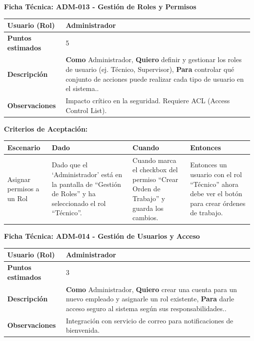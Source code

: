 \noindent
\textbf{Ficha Técnica: ADM-013 - Gestión de Roles y Permisos}
\footnotesize
\begin{longtable}{|p{}|p{}|}
\hline
\textbf{Usuario (Rol)} & Administrador \\ \hline
\textbf{Puntos estimados} & 5 \\ \hline
\textbf{Descripción} & \textbf{Como} Administrador, \textbf{Quiero} definir y gestionar los roles de usuario (ej. Técnico, Supervisor), \textbf{Para} controlar qué conjunto de acciones puede realizar cada tipo de usuario en el sistema.. \\ \hline
\textbf{Observaciones} & Impacto crítico en la seguridad. Requiere ACL (Access Control List). \\ \hline
\end{longtable}
\normalsize

\noindent
\textbf{Criterios de Aceptación:}
\footnotesize
\begin{longtable}{|p{}|p{}|p{}|p{}|}
\hline
\textbf{Escenario} & \textbf{Dado} & \textbf{Cuando} & \textbf{Entonces} \\ \hline
\endhead
Asignar permisos a un Rol & Dado que el `Administrador' está en la pantalla de ``Gestión de Roles'' y ha seleccionado el rol ``Técnico''. & Cuando marca el checkbox del permiso ``Crear Orden de Trabajo'' y guarda los cambios. & Entonces un usuario con el rol ``Técnico'' ahora debe ver el botón para crear órdenes de trabajo. \\ \hline
\end{longtable}
\normalsize

\noindent
\textbf{Ficha Técnica: ADM-014 - Gestión de Usuarios y Acceso}
\footnotesize
\begin{longtable}{|p{}|p{}|}
\hline
\textbf{Usuario (Rol)} & Administrador \\ \hline
\textbf{Puntos estimados} & 3 \\ \hline
\textbf{Descripción} & \textbf{Como} Administrador, \textbf{Quiero} crear una cuenta para un nuevo empleado y asignarle un rol existente, \textbf{Para} darle acceso seguro al sistema según sus responsabilidades.. \\ \hline
\textbf{Observaciones} & Integración con servicio de correo para notificaciones de bienvenida. \\ \hline
\end{longtable}
\normalsize

